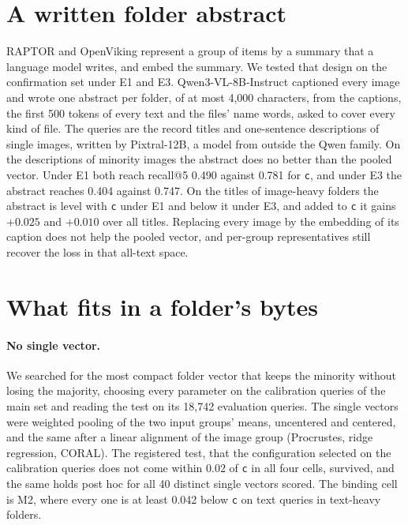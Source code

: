 \documentclass[sigconf,natbib=true,anonymous=true]{acmart}
\newcommand{\rep}[1]{\texttt{#1}}
\begin{document}
\section{A written folder abstract}
\label{sec:abstracts}

RAPTOR and OpenViking represent a group of items by a summary that a language model writes, and embed the summary. We tested that design on the confirmation set under E1 and E3. Qwen3-VL-8B-Instruct captioned every image and wrote one abstract per folder, of at most 4,000 characters, from the captions, the first 500 tokens of every text and the files' name words, asked to cover every kind of file. The queries are the record titles and one-sentence descriptions of single images, written by Pixtral-12B, a model from outside the Qwen family. On the descriptions of minority images the abstract does no better than the pooled vector. Under E1 both reach recall@5 0.490 against 0.781 for \rep{c}, and under E3 the abstract reaches 0.404 against 0.747. On the titles of image-heavy folders the abstract is level with \rep{c} under E1 and below it under E3, and added to \rep{c} it gains $+0.025$ and $+0.010$ over all titles. Replacing every image by the embedding of its caption does not help the pooled vector, and per-group representatives still recover the loss in that all-text space.

\section{What fits in a folder's bytes}
\label{sec:remedy}

\paragraph{No single vector.} We searched for the most compact folder vector that keeps the minority without losing the majority, choosing every parameter on the calibration queries of the main set and reading the test on its 18,742 evaluation queries. The single vectors were weighted pooling of the two input groups' means, uncentered and centered, and the same after a linear alignment of the image group (Procrustes, ridge regression, CORAL). The registered test, that the configuration selected on the calibration queries does not come within 0.02 of \rep{c} in all four cells, survived, and the same holds post hoc for all 40 distinct single vectors scored. The binding cell is M2, where every one is at least 0.042 below \rep{c} on text queries in text-heavy folders.
\end{document}
